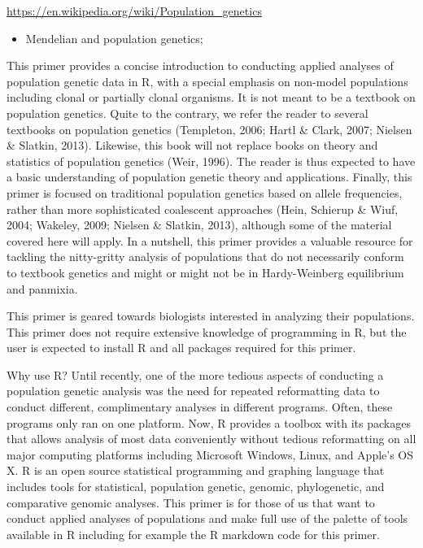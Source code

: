 \documentclass[12pt,]{krantz}
\providecommand{\tightlist}{%
  \setlength{\itemsep}{0pt}\setlength{\parskip}{0pt}}
\theoremstyle{definition}
\theoremstyle{definition}
\theoremstyle{definition}
\theoremstyle{remark}
\begin{document}
\url{https://en.wikipedia.org/wiki/Population_genetics}

\begin{itemize}
\tightlist
\item
  Mendelian and population genetics;
\end{itemize}

This primer provides a concise introduction to conducting applied
analyses of population genetic data in R, with a special emphasis on
non-model populations including clonal or partially clonal organisms. It
is not meant to be a textbook on population genetics. Quite to the
contrary, we refer the reader to several textbooks on population
genetics (Templeton, 2006; Hartl \& Clark, 2007; Nielsen \& Slatkin,
2013). Likewise, this book will not replace books on theory and
statistics of population genetics (Weir, 1996). The reader is thus
expected to have a basic understanding of population genetic theory and
applications. Finally, this primer is focused on traditional population
genetics based on allele frequencies, rather than more sophisticated
coalescent approaches (Hein, Schierup \& Wiuf, 2004; Wakeley, 2009;
Nielsen \& Slatkin, 2013), although some of the material covered here
will apply. In a nutshell, this primer provides a valuable resource for
tackling the nitty-gritty analysis of populations that do not
necessarily conform to textbook genetics and might or might not be in
Hardy-Weinberg equilibrium and panmixia.

This primer is geared towards biologists interested in analyzing their
populations. This primer does not require extensive knowledge of
programming in R, but the user is expected to install R and all packages
required for this primer.

Why use R? Until recently, one of the more tedious aspects of conducting
a population genetic analysis was the need for repeated reformatting
data to conduct different, complimentary analyses in different programs.
Often, these programs only ran on one platform. Now, R provides a
toolbox with its packages that allows analysis of most data conveniently
without tedious reformatting on all major computing platforms including
Microsoft Windows, Linux, and Apple's OS X. R is an open source
statistical programming and graphing language that includes tools for
statistical, population genetic, genomic, phylogenetic, and comparative
genomic analyses. This primer is for those of us that want to conduct
applied analyses of populations and make full use of the palette of
tools available in R including for example the R markdown code for this
primer.
\end{document}
